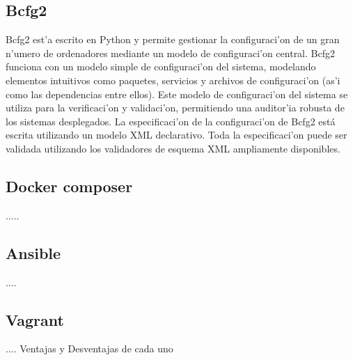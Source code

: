 \subsection{Bcfg2}
Bcfg2 est'a escrito en Python y permite gestionar la configuraci'on de un gran n'umero de ordenadores mediante un modelo de configuraci'on central. Bcfg2 funciona con un modelo simple de configuraci'on del sistema, modelando elementos intuitivos como paquetes, servicios y archivos de configuraci'on (as'i como las dependencias entre ellos). Este modelo de configuraci'on del sistema se utiliza para la verificaci'on  y validaci'on, permitiendo una auditor'ia robusta de los sistemas desplegados. La especificaci'on de la configuraci'on de Bcfg2 está escrita utilizando un modelo XML declarativo. Toda la especificaci'on puede ser validada utilizando los validadores de esquema XML ampliamente disponibles. \cite{bdfg215}

\subsection{Docker composer}
.....

\subsection{Ansible}
....

\subsection{Vagrant}
....
Ventajas y Desventajas de cada uno
